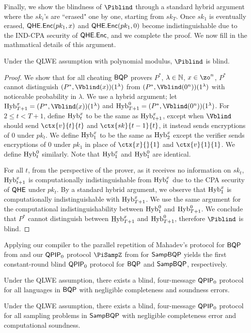 Finally, we show the blindness of $\Piblind$ through a standard hybrid argument where the $sk_i$'s are ``erased" one by one, starting from $sk_T$.
Once $sk_1$ is eventually erased, $\mathsf{QHE.Enc}(pk_1, x)$ and $\mathsf{QHE.Enc}(pk_1, 0)$ become indistinguishable due to the IND-CPA security of $\mathsf{QHE.Enc}$, and we complete the proof.
We now fill in the mathmatical details of this argument.

\begin{thm} \label{thm:compiler-blindness}
    Under the QLWE assumption with polynomial modulus, $\Piblind$ is blind.
\end{thm}
\begin{proof}
    We show that for all cheating $\operatorname{\mathsf{BQP}}$ provers $P^*$, $\lambda\in\mathbb{N}$, $x\in\zo^n$,
    $P^*$ cannot distinguish $(P^*, \Vblind(x))(1^\lambda)$ from $(P^*, \Vblind(0^n))(1^\lambda)$ with noticeable probability in $\lambda$.
    We use a hybrid argument; let $\Hyb_{T+1}^x=(P^*, \Vblind(x))(1^\lambda)$ and $\Hyb_{T+1}^0=(P^*, \Vblind(0^n))(1^\lambda)$.
    For $2\leq t<T+1$, define $\operatorname{Hyb}_t^x$ to be the same as $\operatorname{Hyb}_{t+1}^x$,
    except when $\Vblind$ should send $\ctx{v}{t}{t}$ and $\ctx{sk}{t-1}{t}$, it instead sends encryptions of $0$ under $pk_t$.
    We define $\operatorname{Hyb}_1^x$ to be the same as $\operatorname{Hyb}_2^x$ except the verifier sends encryptions of $0$ under $pk_1$ in place of $\ctx{x}{}{1}$ and $\ctx{v}{1}{1}$.
    We define $\operatorname{Hyb}_t^0$ similarly. Note that $\operatorname{Hyb}_1^x$ and $\operatorname{Hyb}_1^0$ are identical.

    For all $t$, from the perspective of the prover,
    as it receives no information on $sk_t$,
    $\operatorname{Hyb}_{t+1}^x$ is computationally indistinguishable from $\operatorname{Hyb}_t^x$ due to the CPA security of $\mathsf{QHE}$ under $pk_t$.
    By a standard hybrid argument, we observe that $\operatorname{Hyb}_1^x$ is computationally indistinguishable with $\operatorname{Hyb}_{T+1}^x$.
    We use the same argument for the computational indistinguishability between $\operatorname{Hyb}_1^0$ and $\operatorname{Hyb}_{T+1}^0$.
    We conclude that $P^*$ cannot distinguish between $\operatorname{Hyb}_{T+1}^x$ and $\operatorname{Hyb}_{T+1}^0$,
    therefore $\Piblind$ is blind.
\end{proof}

Applying our compiler to the parallel repetition of Mahadev's protocol for $\operatorname{\mathsf{BQP}}$ from \cite{arXiv:ChiaChungYam19, arXiv:AlaChiHun19} and our $\operatorname{\mathsf{QPIP}}_0$ protocol $\PiSampZ$ from  for $\operatorname{\mathsf{SampBQP}}$ yields the first constant-round blind $\operatorname{\mathsf{QPIP}}_0$ protocol for $\operatorname{\mathsf{BQP}}$ and $\operatorname{\mathsf{SampBQP}}$, respectively.

\begin{thm}
    Under the QLWE assumption, there exists a blind, four-message $\operatorname{\mathsf{QPIP}}_0$ protocol for all languages in $\operatorname{\mathsf{BQP}}$ with negligible completeness and soundness errors.
\end{thm}

\begin{thm}
        Under the QLWE assumption, there exists a blind, four-message $\operatorname{\mathsf{QPIP}}_0$ protocol for all sampling problems in $\operatorname{\mathsf{SampBQP}}$ with negligible completeness error and computational soundness.
\end{thm}
